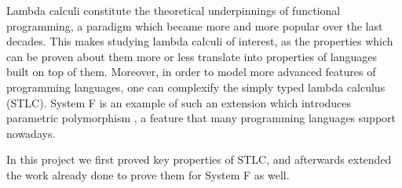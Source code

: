 Lambda calculi constitute the theoretical underpinnings of
functional programming, a paradigm which became more and more popular over the last decades. 
This makes studying lambda calculi of interest, as the properties which can be proven about them more or less translate into properties of languages built on top of them.
Moreover, in order to model more advanced features of programming languages, one can complexify the simply typed lambda calculus (STLC). System F is an example of such an extension which introduces parametric polymorphism \cite{Cardelli1985OnUT}, a feature that many programming languages support nowadays.

In this project we first proved key properties of STLC, and afterwards extended the work already done to prove them for System F as well.